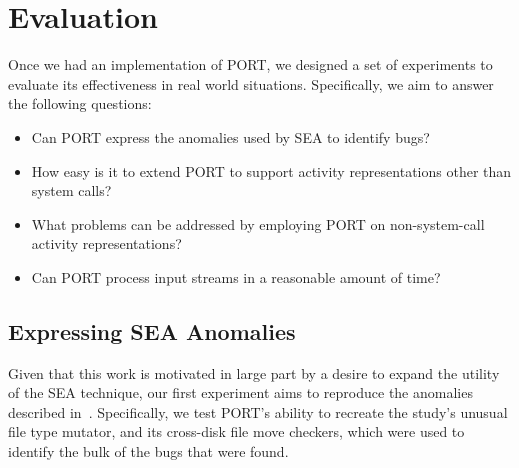 \section{Evaluation}
\label{sec:PORTevaluation}

Once we had an implementation of PORT, we designed a set of experiments to evaluate its  effectiveness in real world situations.
Specifically, we aim to answer the following questions:

\begin{itemize}

  \item{Can PORT express the anomalies used by SEA to identify bugs?}

  \item{How easy is it to extend PORT to support activity representations
    other than system calls?}

  \item{What problems can be addressed by employing PORT on
  non-system-call activity representations?}

  \item{Can PORT process input streams in a reasonable amount of time?}

\end{itemize}


\subsection{Expressing SEA Anomalies}
\label{sub:SEAAnomalies}
Given that this work is motivated
in large part
by a desire to expand the utility of the SEA technique,
our first experiment aims to reproduce the anomalies described
in~\cite{DBLP:conf/issre/MooreCFW19}.
Specifically,
we test PORT's ability to recreate
the study's unusual file type mutator,
and its cross-disk file move checkers, which were used to identify
the bulk of the bugs that were found.



